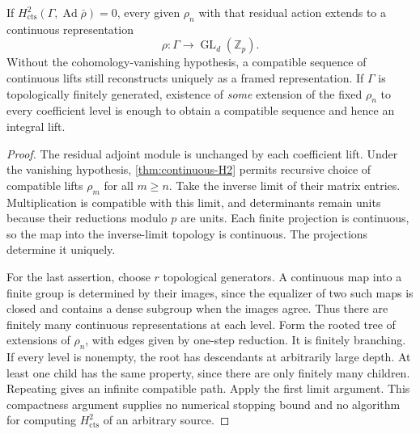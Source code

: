 \begin{theorem}\label{thm:continuous-tower}
If $H^2_{\mathrm{cts}}(\Gamma,\operatorname{Ad}\bar\rho)=0$, every given $\rho_n$ with that residual action extends to a continuous representation
\[
 \rho:\Gamma\longrightarrow\operatorname{GL}_d(\mathbb Z_p).
\]
Without the cohomology-vanishing hypothesis, a compatible sequence of continuous lifts still reconstructs uniquely as a framed representation. If $\Gamma$ is topologically finitely generated, existence of \emph{some} extension of the fixed $\rho_n$ to every coefficient level is enough to obtain a compatible sequence and hence an integral lift.
\end{theorem}
\begin{proof}
The residual adjoint module is unchanged by each coefficient lift. Under the vanishing hypothesis, \cref{thm:continuous-H2} permits recursive choice of compatible lifts $\rho_m$ for all $m\geq n$. Take the inverse limit of their matrix entries. Multiplication is compatible with this limit, and determinants remain units because their reductions modulo $p$ are units. Each finite projection is continuous, so the map into the inverse-limit topology is continuous. The projections determine it uniquely.

For the last assertion, choose $r$ topological generators. A continuous map into a finite group is determined by their images, since the equalizer of two such maps is closed and contains a dense subgroup when the images agree. Thus there are finitely many continuous representations at each level. Form the rooted tree of extensions of $\rho_n$, with edges given by one-step reduction. It is finitely branching. If every level is nonempty, the root has descendants at arbitrarily large depth. At least one child has the same property, since there are only finitely many children. Repeating gives an infinite compatible path. Apply the first limit argument. This compactness argument supplies no numerical stopping bound and no algorithm for computing $H^2_{\mathrm{cts}}$ of an arbitrary source.
\end{proof}

